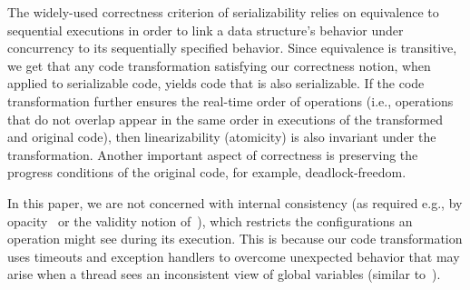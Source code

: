 The widely-used correctness criterion of serializability relies on equivalence to sequential executions in order to
link a data structure's behavior under concurrency to its sequentially specified behavior. Since equivalence is transitive,
we get that any code transformation satisfying our correctness notion, when applied to serializable code, yields code that is also serializable.
If the code transformation further ensures the real-time order of operations (i.e., operations that do not overlap appear in the same order in 
executions of the transformed and original code), then linearizability (atomicity) is also invariant under the transformation.
Another important aspect of correctness is preserving the progress conditions of the original code, for example, deadlock-freedom.

In this paper, we are not concerned with internal consistency (as required e.g., by opacity~\cite{GuerraouiK2008} or the validity notion of~\cite{LevAriCK2014}),
which restricts the configurations an operation might see during its execution.
This is because our code transformation uses timeouts and exception handlers to overcome unexpected behavior that may arise when a thread sees an inconsistent view of global variables (similar to~\cite{Nakaike:2010}).

